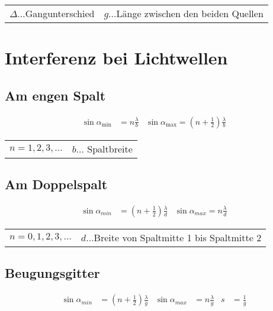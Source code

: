 			\begin{table}[h]
			\begin{tabular}{ll}
			$\Delta\dots$Gangunterschied & $g\dots$Länge zwischen den beiden Quellen\\
			\end{tabular}
			\end{table}
		
	\section{Interferenz bei Lichtwellen}
		\subsection{Am engen Spalt}
			\begin{align*}
				\sin\alpha_{\min} &= n \frac{\lambda}{b} & \sin\alpha_{\max} = \left(n + \frac12\right) \frac{\lambda}{b}
			\end{align*}
			
			\begin{table}[h]
			\begin{tabular}{ll}
			$n=1,2,3,\dots$ & $b\dots$ Spaltbreite\\
			\end{tabular}
			\end{table}
			
		\subsection{Am Doppelspalt}
			\begin{align*}
				\sin\alpha_{min} &= \left(n + \frac12\right) \frac{\lambda}{d} & \sin\alpha_{max} = n\frac{\lambda}{d}
			\end{align*}
			\begin{table}[h]
			\begin{tabular}{ll}
			$n=0,1,2,3,\dots$ & $d\dots$Breite von Spaltmitte 1 bis Spaltmitte 2\\
			\end{tabular}
			\end{table}
			
		\subsection{Beugungsgitter}
			\begin{align*}
				\sin\alpha_{min} &= \left(n + \frac12\right) \frac{\lambda}{g} 
				& \sin\alpha_{max}&= n\frac{\lambda}{g} 
				& s&=\frac{1}{g}
			\end{align*}
			
